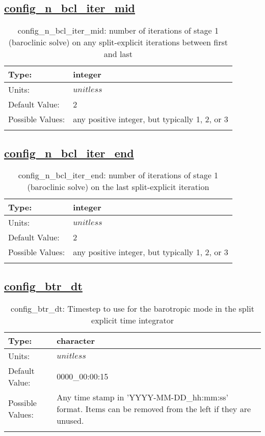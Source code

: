\subsection[config\_n\_bcl\_iter\_mid]{\hyperref[sec:nm_tab_split_explicit_ts]{config\_n\_bcl\_iter\_mid}}
\label{subsec:nm_sec_config_n_bcl_iter_mid}
\begin{center}
\begin{longtable}{| p{2.0in} || p{4.0in} |}
    \hline
    Type: & integer \\
    \hline
    Units: & $unitless$ \\
    \hline
    Default Value: & 2 \\
    \hline
    Possible Values: & any positive integer, but typically 1, 2, or 3 \\
    \hline
    \caption{config\_n\_bcl\_iter\_mid: number of iterations of stage 1 (baroclinic solve) on any split-explicit iterations between first and last}
\end{longtable}
\end{center}
\subsection[config\_n\_bcl\_iter\_end]{\hyperref[sec:nm_tab_split_explicit_ts]{config\_n\_bcl\_iter\_end}}
\label{subsec:nm_sec_config_n_bcl_iter_end}
\begin{center}
\begin{longtable}{| p{2.0in} || p{4.0in} |}
    \hline
    Type: & integer \\
    \hline
    Units: & $unitless$ \\
    \hline
    Default Value: & 2 \\
    \hline
    Possible Values: & any positive integer, but typically 1, 2, or 3 \\
    \hline
    \caption{config\_n\_bcl\_iter\_end: number of iterations of stage 1 (baroclinic solve) on the last split-explicit iteration}
\end{longtable}
\end{center}
\subsection[config\_btr\_dt]{\hyperref[sec:nm_tab_split_explicit_ts]{config\_btr\_dt}}
\label{subsec:nm_sec_config_btr_dt}
\begin{center}
\begin{longtable}{| p{2.0in} || p{4.0in} |}
    \hline
    Type: & character \\
    \hline
    Units: & $unitless$ \\
    \hline
    Default Value: & 0000\_00:00:15 \\
    \hline
    Possible Values: & Any time stamp in 'YYYY-MM-DD\_hh:mm:ss' format. Items can be removed from the left if they are unused. \\
    \hline
    \caption{config\_btr\_dt: Timestep to use for the barotropic mode in the split explicit time integrator}
\end{longtable}
\end{center}
